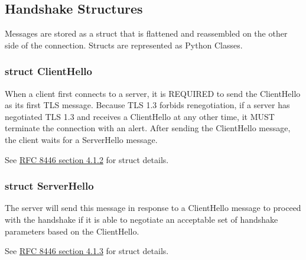 \documentclass{article}
\newcommand{\code}[1]{\tcbox[
    on line,
    colback=codebackground, boxsep=2pt,
    colframe=white, boxrule=0pt,
    top=0pt, bottom=0pt, left=0pt, right=0pt
]{\texttt{#1}}}
\begin{document}
\subsection{Handshake Structures}
Messages are stored as a struct that is flattened and reassembled on the other side of the connection. Structs are represented as Python Classes.
\subsubsection{struct ClientHello}
When a client first connects to a server, it is REQUIRED to send the ClientHello as its first TLS message.
Because TLS 1.3 forbids renegotiation, if a server has negotiated
TLS 1.3 and receives a ClientHello at any other time, it MUST
terminate the connection with an \code{unexpected\_message} alert.
After sending the ClientHello message, the client waits for a ServerHello message.

See \href{https://datatracker.ietf.org/doc/html/rfc8446#section-4.1.2}{RFC 8446 section 4.1.2\tiny\faExternalLink} for struct details.

\subsubsection{struct ServerHello}
The server will send this message in response to a ClientHello
message to proceed with the handshake if it is able to negotiate an
acceptable set of handshake parameters based on the ClientHello.

See \href{https://datatracker.ietf.org/doc/html/rfc8446#section-4.1.3}{RFC 8446 section 4.1.3\tiny\faExternalLink} for struct details.
\end{document}
